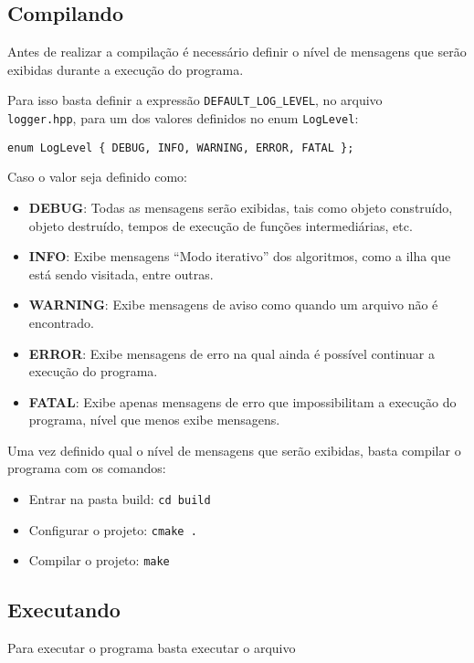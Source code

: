 \documentclass[12pt, a4paper]{article}
\begin{document}
\subsection{Compilando}\label{sec:compilando}
Antes de realizar a compilação é necessário definir o nível de mensagens que serão exibidas durante a execução do programa.

Para isso basta definir a expressão \texttt{DEFAULT\_LOG\_LEVEL}, no arquivo\\\texttt{logger.hpp},
para um dos valores definidos no enum \texttt{LogLevel}:
\begin{lstlisting}[caption={Enum LogLevel}, label={lst:log}]
    enum LogLevel { DEBUG, INFO, WARNING, ERROR, FATAL };
\end{lstlisting}

Caso o valor seja definido como:
\begin{itemize}
    \item\textbf{DEBUG}: Todas as mensagens serão exibidas, tais como objeto construído, objeto destruído, tempos de execução de funções intermediárias, etc.
    \item\textbf{INFO}: Exibe mensagens ``Modo iterativo'' dos algoritmos, como a ilha que está sendo visitada, entre outras.
    \item\textbf{WARNING}: Exibe mensagens de aviso como quando um arquivo não é encontrado.
    \item\textbf{ERROR}: Exibe mensagens de erro na qual ainda é possível continuar a execução do programa.
    \item\textbf{FATAL}: Exibe apenas mensagens de erro que impossibilitam a execução do programa, nível que menos exibe mensagens.
\end{itemize}

Uma vez definido qual o nível de mensagens que serão exibidas, basta compilar o programa com os comandos:
\begin{itemize}
    \item Entrar na pasta build: \texttt{cd build}
    \item Configurar o projeto: \texttt{cmake .}
    \item Compilar o projeto: \texttt{make}
\end{itemize}

\subsection{Executando}\label{sec:executando}
Para executar o programa basta executar o arquivo
\end{document}
